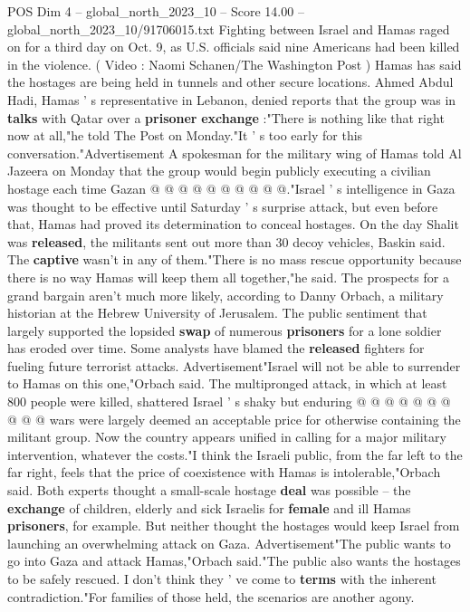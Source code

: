 \begin{textsample}{POS Dim 4 – global\_north\_2023\_10 – Score 14.00 – global\_north\_2023\_10/91706015.txt}
Fighting between Israel and Hamas raged on for a third day on Oct. 9, as U.S. officials said nine Americans had been killed in the violence. ( Video : Naomi Schanen/The Washington Post ) Hamas has said the hostages are being held in tunnels and other secure locations.
Ahmed Abdul Hadi, Hamas ' s representative in Lebanon, denied reports that the group was in \textbf{talks} with Qatar over a \textbf{prisoner} \textbf{exchange} :"There is nothing like that right now at all,"he told The Post on Monday."It ' s too early for this conversation."Advertisement A spokesman for the military wing of Hamas told Al Jazeera on Monday that the group would begin publicly executing a civilian hostage each time Gazan @ @ @ @ @ @ @ @ @ @."Israel ' s intelligence in Gaza was thought to be effective until Saturday ' s surprise attack, but even before that, Hamas had proved its determination to conceal hostages.
On the day Shalit was \textbf{released}, the militants sent out more than 30 decoy vehicles, Baskin said.
The \textbf{captive} wasn't in any of them."There is no mass rescue opportunity because there is no way Hamas will keep them all together,"he said.
The prospects for a grand bargain aren't much more likely, according to Danny Orbach, a military historian at the Hebrew University of Jerusalem.
The public sentiment that largely supported the lopsided \textbf{swap} of numerous \textbf{prisoners} for a lone soldier has eroded over time.
Some analysts have blamed the \textbf{released} fighters for fueling future terrorist attacks.
Advertisement"Israel will not be able to surrender to Hamas on this one,"Orbach said.
The multipronged attack, in which at least 800 people were killed, shattered Israel ' s shaky but enduring @ @ @ @ @ @ @ @ @ @ wars were largely deemed an acceptable price for otherwise containing the militant group.
Now the country appears unified in calling for a major military intervention, whatever the costs."I think the Israeli public, from the far left to the far right, feels that the price of coexistence with Hamas is intolerable,"Orbach said.
Both experts thought a small-scale hostage \textbf{deal} was possible -- the \textbf{exchange} of children, elderly and sick Israelis for \textbf{female} and ill Hamas \textbf{prisoners}, for example.
But neither thought the hostages would keep Israel from launching an overwhelming attack on Gaza.
Advertisement"The public wants to go into Gaza and attack Hamas,"Orbach said."The public also wants the hostages to be safely rescued.
I don't think they ' ve come to \textbf{terms} with the inherent contradiction."For families of those held, the scenarios are another agony.

\end{textsample}
